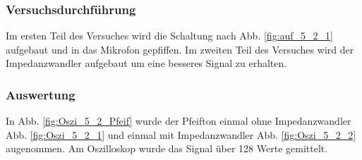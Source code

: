\documentclass[12pt,a4paper]{article}
\begin{document}
\subsubsection*{Versuchsdurchführung}
Im ersten Teil des Versuches wird die Schaltung nach Abb. \ref{fig:auf_5_2_1} aufgebaut und in das Mikrofon gepfiffen.
Im zweiten Teil des Versuches wird der Impedanzwandler aufgebaut um eine besseres Signal zu erhalten. 
\subsubsection*{Auswertung}
In Abb. \ref{fig:Oszi_5_2_Pfeif} wurde der Pfeifton einmal ohne Impedanzwandler Abb. \ref{fig:Oszi_5_2_1} und einmal mit Impedanzwandler Abb. \ref{fig:Oszi_5_2_2} augenommen. Am Oszilloskop wurde das Signal über 128 Werte gemittelt.
\end{document}

